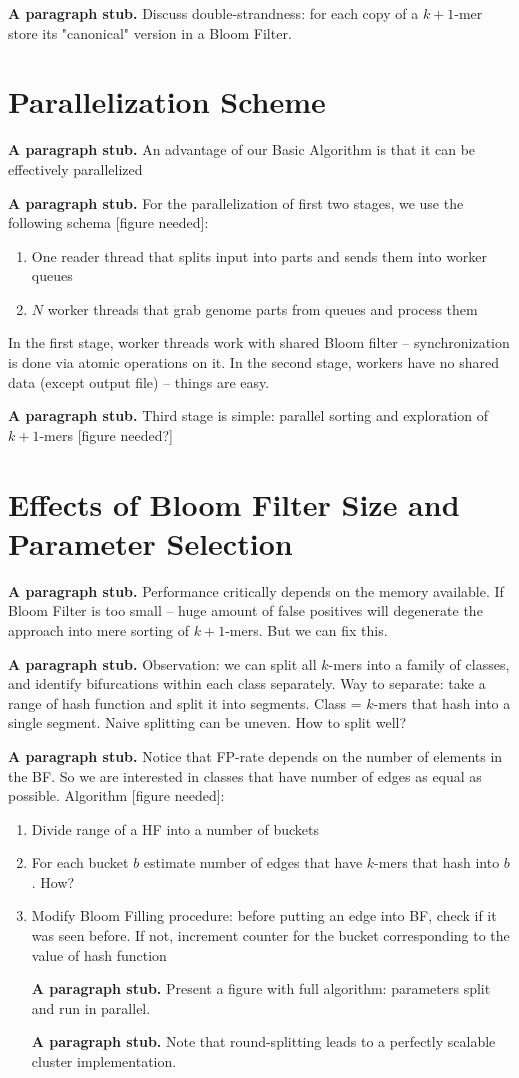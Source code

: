 \documentclass{llncs}
\newcommand{\stub}{\textbf{A paragraph stub. }}
\begin{document}
\stub Discuss double-strandness: for each copy of a $k + 1$-mer store its "canonical" version in a Bloom Filter.


\section{Parallelization Scheme}
\stub An advantage of our Basic Algorithm is that it can be effectively parallelized

\stub For the parallelization of first two stages, we use the following schema [figure needed]:
\begin{enumerate}
	\item One reader thread that splits input into parts and sends them into worker queues
	\item $N$ worker threads that grab genome parts from queues and process them
\end{enumerate}
In the first stage, worker threads work with shared Bloom filter -- synchronization is done via atomic operations on it.
In the second stage, workers have no shared data (except output file) -- things are easy.

\stub Third stage is simple: parallel sorting and exploration of $k + 1$-mers [figure needed?]

\section{Effects of Bloom Filter Size  and Parameter Selection}
\stub Performance critically depends on the memory available.
If Bloom Filter is too small -- huge amount of false positives will degenerate the approach into mere sorting of $k + 1$-mers.
But we can fix this.

\stub Observation: we can split all $k$-mers into a family of classes, and identify bifurcations within each class separately.
Way to separate: take a range of hash function and split it into segments.
Class = $k$-mers that hash into a single segment.
Naive splitting can be uneven.
How to split well?

\stub Notice that FP-rate depends on the number of elements in the BF.
So we are interested in classes that have number of edges as equal as possible.
Algorithm [figure needed]:
\begin{enumerate}
\item Divide range of a HF into a number of buckets
\item For each bucket $b$ estimate number of edges that have $k$-mers that hash into $b$. How?
\item Modify Bloom Filling procedure: before putting an edge into BF, check if it was seen before. 
If not, increment counter for the bucket corresponding to the value of hash function

\stub Present a figure with full algorithm: parameters split and run in parallel.

\stub Note that round-splitting leads to a perfectly scalable cluster implementation.
\end{enumerate}
\end{document}

